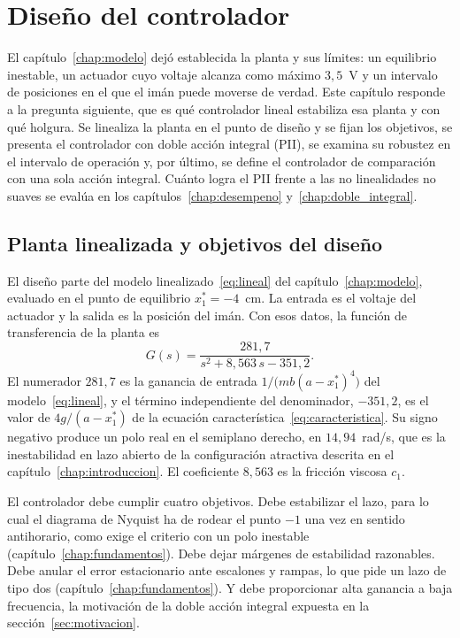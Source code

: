 \chapter{Diseño del controlador}\label{chap:controlador}

El capítulo~\ref{chap:modelo} dejó establecida la planta y sus límites: un equilibrio inestable, un actuador cuyo voltaje alcanza como máximo $3{,}5$~V y un intervalo de posiciones en el que el imán puede moverse de verdad. Este capítulo responde a la pregunta siguiente, que es qué controlador lineal estabiliza esa planta y con qué holgura. Se linealiza la planta en el punto de diseño y se fijan los objetivos, se presenta el controlador con doble acción integral (PII), se examina su robustez en el intervalo de operación y, por último, se define el controlador de comparación con una sola acción integral. Cuánto logra el PII frente a las no linealidades no suaves se evalúa en los capítulos~\ref{chap:desempeno} y~\ref{chap:doble_integral}.

\section{Planta linealizada y objetivos del diseño}\label{sec:planta_diseno}

El diseño parte del modelo linealizado~\eqref{eq:lineal} del capítulo~\ref{chap:modelo}, evaluado en el punto de equilibrio $x_1^*=-4$~cm. La entrada es el voltaje del actuador y la salida es la posición del imán. Con esos datos, la función de transferencia de la planta es
\begin{equation}
G(s)=\frac{281{,}7}{s^{2}+8{,}563\,s-351{,}2} .
\label{eq:planta}
\end{equation}
El numerador $281{,}7$ es la ganancia de entrada $1/\bigl(mb(a-x_1^*)^4\bigr)$ del modelo~\eqref{eq:lineal}, y el término independiente del denominador, $-351{,}2$, es el valor de $4g/(a-x_1^*)$ de la ecuación característica~\eqref{eq:caracteristica}. Su signo negativo produce un polo real en el semiplano derecho, en $14{,}94$~rad/s, que es la inestabilidad en lazo abierto de la configuración atractiva descrita en el capítulo~\ref{chap:introduccion}. El coeficiente $8{,}563$ es la fricción viscosa $c_1$.

El controlador debe cumplir cuatro objetivos. Debe estabilizar el lazo, para lo cual el diagrama de Nyquist ha de rodear el punto $-1$ una vez en sentido antihorario, como exige el criterio con un polo inestable (capítulo~\ref{chap:fundamentos}). Debe dejar márgenes de estabilidad razonables. Debe anular el error estacionario ante escalones y rampas, lo que pide un lazo de tipo dos (capítulo~\ref{chap:fundamentos}). Y debe proporcionar alta ganancia a baja frecuencia, la motivación de la doble acción integral expuesta en la sección~\ref{sec:motivacion}.

